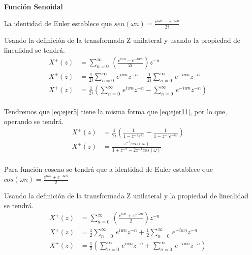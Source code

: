 \documentclass[12pt]{article}
\begin{document}
\textbf{Función Senoidal}
\vspace{5mm} 

La identidad de Euler establece que $sen(\omega n)=\frac{e^{i\omega n}-e^{-i\omega n}}{2i}$

\vspace{5mm}
Usando la definición de la transformada Z unilateral y usando la propiedad de linealidad se tendrá.
\begin{equation}
    \begin{split}
        X^+(z)&=\displaystyle\sum_{n=0}^{\infty}\,(\frac{e^{iwn}-e^{-iwn}}{2i})z^{-n}\\
        X^+(z)&=\frac{1}{2i}\displaystyle\sum_{n=0}^{\infty}\,e^{iwn}z^{-n}-\frac{1}{2i}\displaystyle\sum_{n=0}^{\infty}\,e^{-iwn}z^{-n}\\
        X^+(z)&=\frac{1}{2i}(\displaystyle\sum_{n=0}^{\infty}\,e^{iwn}z^{-n}-\displaystyle\sum_{n=0}^{\infty}\,e^{-iwn}z^{-n})\\
    \end{split}
    \label{eq:ejer5}
\end{equation}

Tendremos que \ref{eq:ejer5} tiene la misma forma que \ref{eq:ejer11}, por lo que, operando se tendrá.
\begin{equation}
    \begin{split}
        X^+(z)&=\frac{1}{2i}(\frac{1}{1-z^{-1}e^{i\omega}}-\frac{1}{1-z^{-1}e^{-i\omega}})\\
        X^+(z)&=\frac{z^{-1}sen(\omega)}{1+z^{-2}-2z^{-1}cos(\omega)}\\
    \end{split}
    \label{eq:ejer51}
\end{equation}

Para función coseno se tendrá que 
a identidad de Euler establece que $cos(\omega n)=\frac{e^{i\omega n}+e^{-i\omega n}}{2}$

\vspace{5mm}
Usando la definición de la transformada Z unilateral y la propiedad de linealidad se tendrá.
\begin{equation}
    \begin{split}
        X^+(z)&=\displaystyle\sum_{n=0}^{\infty}\,(\frac{e^{i\omega n}+e^{-i\omega n}}{2})z^{-n}\\
        X^+(z)&=\frac{1}{2}\displaystyle\sum_{n=0}^{\infty}\,e^{iwn}z^{-n}+\frac{1}{2}\displaystyle\sum_{n=0}^{\infty}\,e^{-iwn}z^{-n}\\
        X^+(z)&=\frac{1}{2}(\displaystyle\sum_{n=0}^{\infty}\,e^{iwn}z^{-n}+\displaystyle\sum_{n=0}^{\infty}\,e^{-iwn}z^{-n})\\
    \end{split}
    \label{eq:ejer6}
\end{equation}
\end{document}

